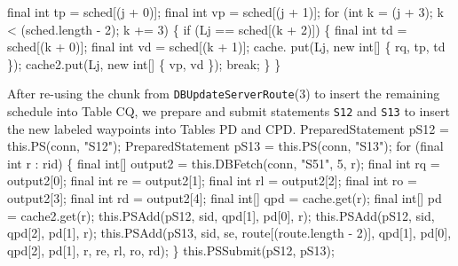 \documentclass{article}
\def\nwendcode{\endtrivlist \endgroup}      %
\let\nwdocspar=\par
\theoremstyle{definition}                   %
\begin{document}
\nwenddocs{}\endmoddef{}
final int tp = sched[(j + 0)];
final int vp = sched[(j + 1)];
for (int k = (j + 3); k < (sched.length - 2); k += 3) \{
  if (Lj == sched[(k + 2)]) \{
    final int td = sched[(k + 0)];
    final int vd = sched[(k + 1)];
    cache. put(Lj, new int[] \{ rq, tp, td \});
    cache2.put(Lj, new int[] \{ vp, vd \});
    break;
  \}
\}
\nwendcode{}\nwdocspar
{\small After re-using the chunk from {\tt{}\protect{}DBUpdateServerRoute}(3) to insert the
remaining schedule into Table CQ, we prepare and submit statements {\tt{}\protect{}S12} and
{\tt{}\protect{}S13} to insert the new labeled waypoints into Tables PD and CPD.}
\nwenddocs{}\endmoddef{}
PreparedStatement pS12 = this.PS(conn, "S12");
PreparedStatement pS13 = this.PS(conn, "S13");
for (final int r : rid) \{
  final int[] output2 = this.DBFetch(conn, "S51", 5, r);
  final int rq = output2[0];
  final int re = output2[1];
  final int rl = output2[2];
  final int ro = output2[3];
  final int rd = output2[4];
  final int[] qpd = cache.get(r);
  final int[]  pd = cache2.get(r);
  this.PSAdd(pS12, sid, qpd[1], pd[0], r);
  this.PSAdd(pS12, sid, qpd[2], pd[1], r);
  this.PSAdd(pS13, sid, se, route[(route.length - 2)], qpd[1], pd[0], qpd[2], pd[1],
        r, re, rl, ro, rd);
\}
this.PSSubmit(pS12, pS13);
\nwendcode{}\nwdocspar
\end{document}
